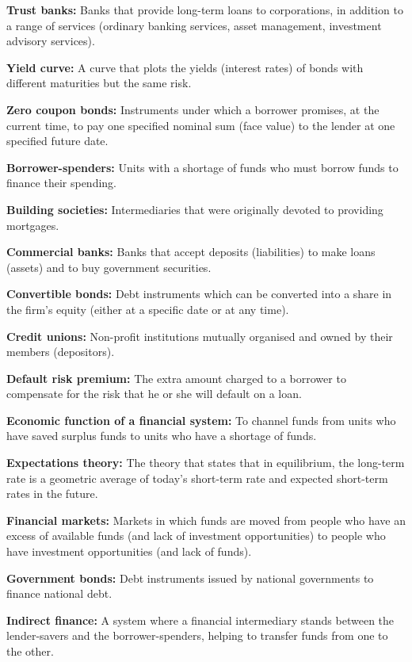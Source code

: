 \documentclass[twoside,openany]{book}
\begin{document}
\textbf{Trust banks:} Banks that provide long-term loans to corporations, in addition to a range of services (ordinary banking services, asset management, investment advisory services).

\textbf{Yield curve:} A curve that plots the yields (interest rates) of bonds with different maturities but the same risk.

\textbf{Zero coupon bonds:} Instruments under which a borrower promises, at the current time, to pay one specified nominal sum (face value) to the lender at one specified future date.

\textbf{Borrower-spenders:} Units with a shortage of funds who must borrow funds to finance their spending.

\textbf{Building societies:} Intermediaries that were originally devoted to providing mortgages.

\textbf{Commercial banks:} Banks that accept deposits (liabilities) to make loans (assets) and to buy government securities.

\textbf{Convertible bonds:} Debt instruments which can be converted into a share in the firm's equity (either at a specific date or at any time).

\textbf{Credit unions:} Non-profit institutions mutually organised and owned by their members (depositors).

\textbf{Default risk premium:} The extra amount charged to a borrower to compensate for the risk that he or she will default on a loan.

\textbf{Economic function of a financial system:} To channel funds from units who have saved surplus funds to units who have a shortage of funds.

\textbf{Expectations theory:} The theory that states that in equilibrium, the long-term rate is a geometric average of today's short-term rate and expected short-term rates in the future.

\textbf{Financial markets:} Markets in which funds are moved from people who have an excess of available funds (and lack of investment opportunities) to people who have investment opportunities (and lack of funds).

\textbf{Government bonds:} Debt instruments issued by national governments to finance national debt.

\textbf{Indirect finance:} A system where a financial intermediary stands between the lender-savers and the borrower-spenders, helping to transfer funds from one to the other.
\end{document}
